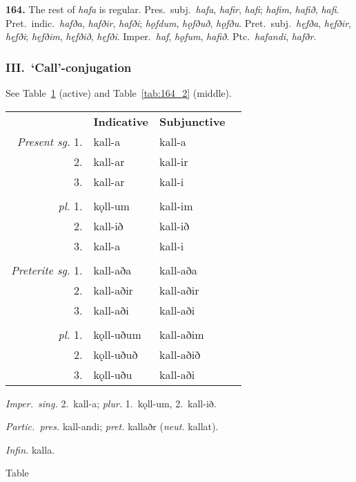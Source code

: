\documentclass[12pt,letterpaper]{book}
\newcommand\newcaption{\small\refstepcounter{table}%
	\centering Table~\thetable}
\begin{document}
\textbf{164.} The rest of \textit{hafa} is regular.  Pres.\ subj.\ \textit{hafa},
\textit{hafir}, \textit{hafi}; \textit{hafim}, \textit{hafið}, \textit{hafi}.
Pret.\ indic.\ \textit{hafða}, \textit{hafðir}, \textit{hafði}; \textit{hǫfdum},
\textit{hǫfðuð}, \textit{hǫfðu}.  Pret.\ subj.\ \textit{hęfða}, \textit{hęfðir},
\textit{hęfði}; \textit{hęfðim}, \textit{hęfðið}, \textit{hęfði}.
Imper.\ \textit{haf}, \textit{hǫfum}, \textit{hafið}.  Ptc.\ \textit{hafandi},
\textit{hafðr}.

\subsubsection{III.\ \textbf{`Call'}-conjugation}

See Table~\ref{tab:164_1} (active) and Table~\ref{tab:164_2} (middle).

\begin{table}[htbp]
\begin{center}
\begin{tabular}{rlll}
    & \textbf{Indicative} & \textbf{Subjunctive} \\
    \textit{Present sg.} 1. & kall-a & kall-a \\
    2. & kall-ar & kall-ir \\
    3. & kall-ar & kall-i \\
    \\
    \textit{pl.} 1. & kǫll-um & kall-im \\
    2. & kall-ið & kall-ið \\
    3. & kall-a & kall-i \\
    \\
    \textit{Preterite sg.} 1. & kall-aða & kall-aða \\
    2. & kall-aðir & kall-aðir \\
    3. & kall-aði & kall-aði \\
    \\
    \textit{pl.} 1. & kǫll-uðum & kall-aðim \\
    2. & kǫll-uðuð & kall-aðið \\
    3. & kǫll-uðu & kall-aði \\
\end{tabular}
\end{center}

\begin{center}
\begin{minipage}{3.5in}
\textit{Imper.\ sing.} 2.\ kall-a; \textit{plur.} 1.\ kǫll-um, 2.\ kall-ið.

\textit{Partic.\ pres.} kall-andi; \textit{pret.} kallaðr (\textit{neut.} kallat).

\textit{Infin.} kalla.
\end{minipage}
\end{center}
\newcaption
\label{tab:164_1}
\end{table}
\end{document}
